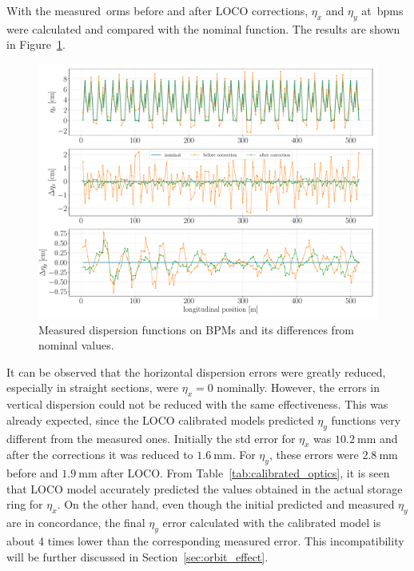 With the measured~\gls{orm}s before and after LOCO corrections, $\eta_x$ and $\eta_y$ at~\glspl{bpm} were calculated and compared with the nominal function. The results are shown in Figure~\ref{fig:disp_error}. 
\begin{figure}
\centering
\includegraphics[width=1.0\textwidth]{figures/dispersion_after_before_loco_legend.pdf}
\caption{Measured dispersion functions on BPMs and its differences from nominal values.}
\label{fig:disp_error}
\end{figure}

It can be observed that the horizontal dispersion errors were greatly reduced, especially in straight sections, were $\eta_x = 0$ nominally. However, the errors in vertical dispersion could not be reduced with the same effectiveness. This was already expected, since the LOCO calibrated models predicted $\eta_y$ functions very different from the measured ones. Initially the std error for $\eta_x$ was $\SI{10.2}{\milli\meter}$ and after the corrections it was reduced to $\SI{1.6}{\milli\meter}$. For $\eta_y$, these errors were $\SI{2.8}{\milli\meter}$ before and $\SI{1.9}{\milli\meter}$ after LOCO. From Table~\ref{tab:calibrated_optics}, it is seen that LOCO model accurately predicted the values obtained in the actual storage ring for $\eta_x$. On the other hand, even though the initial predicted and measured  $\eta_y$ are in concordance, the final $\eta_y$ error calculated with the calibrated model is about 4 times lower than the corresponding measured error. This incompatibility will be further discussed in Section~\ref{sec:orbit_effect}.

